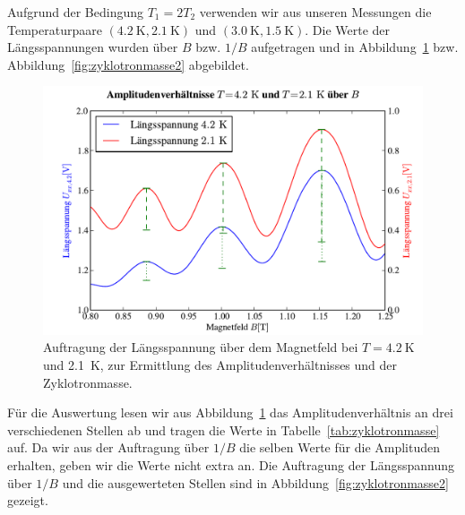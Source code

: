 \documentclass[paper=a4,fontsize=10pt,DIV=18,twocolumn,parskip=half]{scrartcl}
\numberwithin{equation}{section}    %
\begin{document}
Aufgrund der Bedingung $T_{1}=2T_{2}$ verwenden wir aus unseren Messungen die Temperaturpaare $(\SI{4.2}{\kelvin},\SI{2.1}{\kelvin})$ und $(\SI{3.0}{\kelvin},\SI{1.5}{\kelvin})$. Die Werte der Längsspannungen wurden über $B$ bzw. $1/B$ aufgetragen und in Abbildung~\ref{fig:zyklotronmasse} bzw. Abbildung~\ref{fig:zyklotronmasse2} abgebildet.
\begin{figure}[htp]
	\begin{center}
		\includegraphics[width=\columnwidth]{Data-Plots/11-4,2-2,1-zyklotron-B.pdf}
		\caption{Auftragung der Längsspannung über dem Magnetfeld bei $T=\SI{4.2}{\kelvin}$ und \SI{2.1}{\kelvin}, zur Ermittlung des Amplitudenverhältnisses und der Zyklotronmasse.}
		\label{fig:zyklotronmasse}
	\end{center}
\end{figure}
Für die Auswertung lesen wir aus Abbildung~\ref{fig:zyklotronmasse} das Amplitudenverhältnis an drei verschiedenen Stellen ab und tragen die Werte in Tabelle~\ref{tab:zyklotronmasse} auf. Da wir aus der Auftragung über $1/B$ die selben Werte für die Amplituden erhalten, geben wir die Werte nicht extra an. Die Auftragung der Längsspannung über $1/B$ und die ausgewerteten Stellen sind in Abbildung~\ref{fig:zyklotronmasse2} gezeigt.
\end{document}

